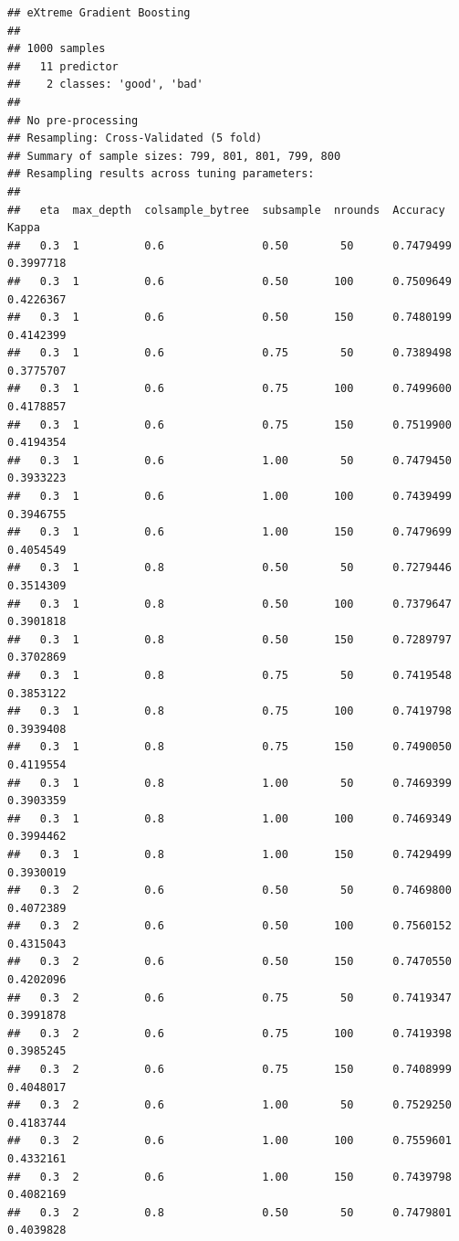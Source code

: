 \documentclass[
]{book}
\theoremstyle{break}
\theoremstyle{definition}
\theoremstyle{definition}
\theoremstyle{definition}
\theoremstyle{definition}
\theoremstyle{remark}
\begin{document}
\begin{verbatim}
## eXtreme Gradient Boosting 
## 
## 1000 samples
##   11 predictor
##    2 classes: 'good', 'bad' 
## 
## No pre-processing
## Resampling: Cross-Validated (5 fold) 
## Summary of sample sizes: 799, 801, 801, 799, 800 
## Resampling results across tuning parameters:
## 
##   eta  max_depth  colsample_bytree  subsample  nrounds  Accuracy   Kappa    
##   0.3  1          0.6               0.50        50      0.7479499  0.3997718
##   0.3  1          0.6               0.50       100      0.7509649  0.4226367
##   0.3  1          0.6               0.50       150      0.7480199  0.4142399
##   0.3  1          0.6               0.75        50      0.7389498  0.3775707
##   0.3  1          0.6               0.75       100      0.7499600  0.4178857
##   0.3  1          0.6               0.75       150      0.7519900  0.4194354
##   0.3  1          0.6               1.00        50      0.7479450  0.3933223
##   0.3  1          0.6               1.00       100      0.7439499  0.3946755
##   0.3  1          0.6               1.00       150      0.7479699  0.4054549
##   0.3  1          0.8               0.50        50      0.7279446  0.3514309
##   0.3  1          0.8               0.50       100      0.7379647  0.3901818
##   0.3  1          0.8               0.50       150      0.7289797  0.3702869
##   0.3  1          0.8               0.75        50      0.7419548  0.3853122
##   0.3  1          0.8               0.75       100      0.7419798  0.3939408
##   0.3  1          0.8               0.75       150      0.7490050  0.4119554
##   0.3  1          0.8               1.00        50      0.7469399  0.3903359
##   0.3  1          0.8               1.00       100      0.7469349  0.3994462
##   0.3  1          0.8               1.00       150      0.7429499  0.3930019
##   0.3  2          0.6               0.50        50      0.7469800  0.4072389
##   0.3  2          0.6               0.50       100      0.7560152  0.4315043
##   0.3  2          0.6               0.50       150      0.7470550  0.4202096
##   0.3  2          0.6               0.75        50      0.7419347  0.3991878
##   0.3  2          0.6               0.75       100      0.7419398  0.3985245
##   0.3  2          0.6               0.75       150      0.7408999  0.4048017
##   0.3  2          0.6               1.00        50      0.7529250  0.4183744
##   0.3  2          0.6               1.00       100      0.7559601  0.4332161
##   0.3  2          0.6               1.00       150      0.7439798  0.4082169
##   0.3  2          0.8               0.50        50      0.7479801  0.4039828

\end{verbatim}
\end{document}
